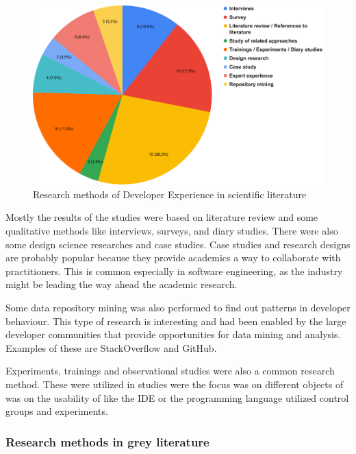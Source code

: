 \documentclass[english, 12pt, a4paper, sci, utf8, a-1b, online]{aaltothesis}
\begin{document}
\begin{figure}[ht]
  \begin{center}
    \includegraphics[width=\textwidth]{research-methods-scientific.pdf}
  \end{center}
  \captionsetup{width=0.6\textwidth}
  \caption{Research methods of Developer Experience in scientific literature}
\end{figure}

Mostly the results of the studies were based on literature review and some qualitative methods like interviews, surveys, and diary studies. There were also some design science researches and case studies. Case studies and research designs are probably popular because they provide academics a way to collaborate with practitioners. This is common especially in software engineering, as the industry might be leading the way ahead the academic research.

Some data repository mining was also performed to find out patterns in developer behaviour. This type of research is interesting and had been enabled by the large developer communities that provide opportunities for data mining and analysis. Examples of these are StackOverflow and GitHub.

Experiments, trainings and observational studies were also a common research method. These were utilized in studies were the focus was on different objects of  was on the usability of  like the IDE or the programming language utilized control groups and experiments.

\subsubsection{Research methods in grey literature}
\end{document}
